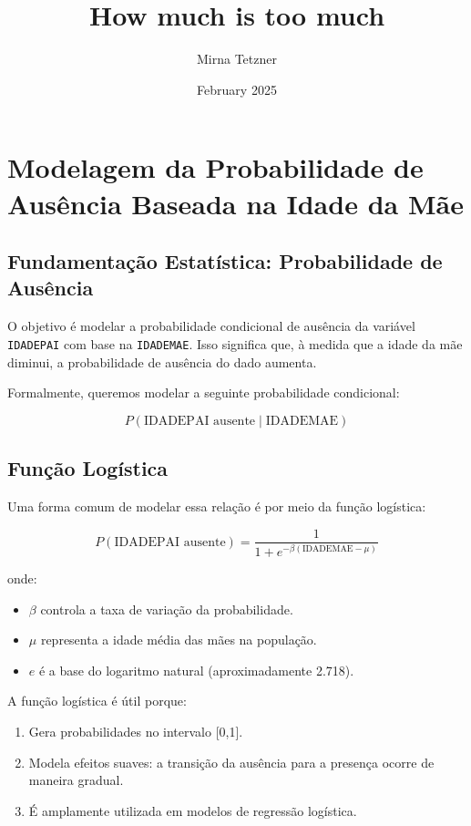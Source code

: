 \documentclass{article}
\title{How much is too much}
\author{Mirna Tetzner}
\date{February 2025}
\begin{document}
\maketitle

\section{Modelagem da Probabilidade de Ausência Baseada na Idade da Mãe}

\subsection{Fundamentação Estatística: Probabilidade de Ausência}

O objetivo é modelar a probabilidade condicional de ausência da variável \texttt{IDADEPAI} com base na \texttt{IDADEMAE}. Isso significa que, à medida que a idade da mãe diminui, a probabilidade de ausência do dado aumenta.

Formalmente, queremos modelar a seguinte probabilidade condicional:

\[
P(\text{IDADEPAI ausente} \mid \text{IDADEMAE})
\]

\subsection{Função Logística}

Uma forma comum de modelar essa relação é por meio da função logística:

\[
P(\text{IDADEPAI ausente}) = \frac{1}{1 + e^{-\beta (\text{IDADEMAE} - \mu)}}
\]

onde:

\begin{itemize}
    \item \( \beta \) controla a taxa de variação da probabilidade.
    \item \( \mu \) representa a idade média das mães na população.
    \item \( e \) é a base do logaritmo natural (aproximadamente 2.718).
\end{itemize}

A função logística é útil porque:

\begin{enumerate}
    \item Gera probabilidades no intervalo [0,1].
    \item Modela efeitos suaves: a transição da ausência para a presença ocorre de maneira gradual.
    \item É amplamente utilizada em modelos de regressão logística.
\end{enumerate}
\end{document}
